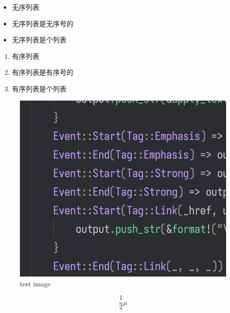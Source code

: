 \begin{itemize}
\item 无序列表
\item 无序列表是无序号的
\item 无序列表是个列表
\end{itemize}
\begin{enumerate}
\item 有序列表
\item 有序列表是有序号的
\item 有序列表是个列表
\end{enumerate}
\begin{figure}[h]
\includegraphics{images/test.jpg}
\caption{test image}
\label{fig:images/test.jpg}
\end{figure}


\begin{equation}
\frac{1}{2}\mu
\label{eq:hhhhh}
\end{equation}

